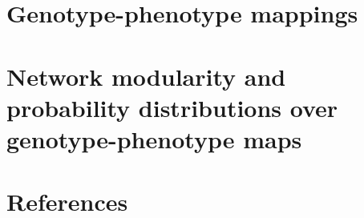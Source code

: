 

%

\newtoggle{thmsty}
\togglefalse{thmsty}

\newtoggle{longpres}
\togglefalse{longpres}



%





	\begin{frame}
		\titlepage
	\end{frame}



	\section[GP maps]{Genotype-phenotype mappings}
	

	\section[NM and PDoGPM]{Network modularity and probability distributions over genotype-phenotype maps}
	






	

	\section{References}
	


